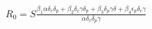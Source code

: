 \documentclass[preview]{standalone}
\begin{document}
\begin{center}
$R_0 = S \frac{\beta_1 \alpha \delta_c \delta_p + \beta_2 \delta_c \gamma \delta_p + \beta_3 \delta_p \gamma \delta + \beta_4 \epsilon_p \delta_c \gamma}{\alpha \delta_c \delta_p \gamma}$
\end{center}
\end{document}
